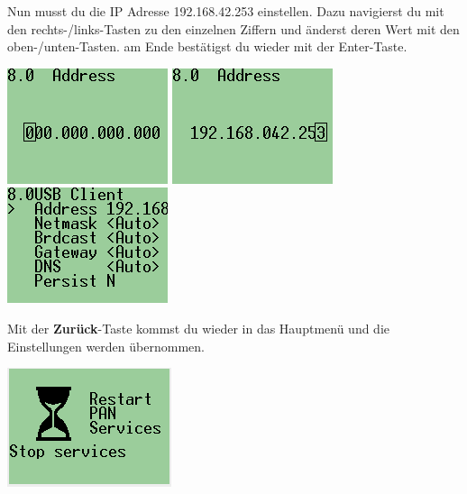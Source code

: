 \documentclass[
	12pt,
	article,
	type=bsc, %
	colorbacktitle,
	instlogo,
	accentcolor=tud1c,
	german,
	twoside
]{tudexercise}
\begin{document}
\begin{enumerate}
		Nun musst du die IP Adresse 192.168.42.253 einstellen. Dazu navigierst du mit den rechts-/links-Tasten zu den einzelnen Ziffern und änderst deren Wert mit den oben-/unten-Tasten. am Ende bestätigst du wieder mit der Enter-Taste. 
		
		\includegraphics[width=.3\textwidth]{img/ev3_pan_usb_setip1.png}
		\includegraphics[width=.3\textwidth]{img/ev3_pan_usb_setip2.png}
		\includegraphics[width=.3\textwidth]{img/ev3_pan_usb_isset.png}
		
		\begin{minipage}{.6\textwidth}
		\item Mit der \textbf{Zurück}-Taste kommst du wieder in das Hauptmenü und die Einstellungen werden übernommen.
		\end{minipage}
		\hfill
		\begin{minipage}{.3\textwidth}
		\includegraphics[width=\textwidth]{img/ev3_pan_usb_restart.png}
		\end{minipage}
		\end{enumerate}
	
\end{document}
